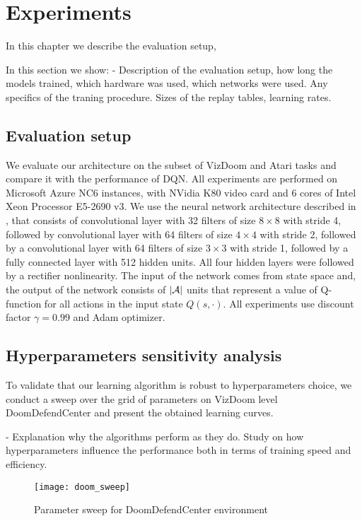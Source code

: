 \section{Experiments}

In this chapter we describe the evaluation setup,

In this section we show:
- Description of the evaluation setup, how long the models trained, which hardware was used,
which networks were used. Any specifics of the traning procedure. Sizes of the replay tables,
learning rates.

\subsection{Evaluation setup}

We evaluate our architecture on the subset of VizDoom and Atari tasks and compare it with the
performance of DQN. All experiments are performed on Microsoft Azure NC6 instances, with NVidia K80
video card and 6 cores of Intel Xeon Processor E5-2690 v3. We use the neural network architecture
described in \cite{mnih-dqn-2015}, that consists of convolutional layer with 32 filters of size $8
\times 8$ with stride 4, followed by convolutional layer with 64 filters of size $4 \times 4$ with
stride 2, followed by a convolutional layer with 64 filters of size $3 \times 3$ with stride 1,
followed by a fully connected layer with 512 hidden units. All four hidden layers were followed by
a rectifier nonlinearity. The input of the network comes from state space and,
the output of the network consists of $\left | \mathcal{A} \right |$ units that represent a value of Q-function
for all actions in the input state $Q(s, \cdot)$.
All experiments use discount factor $\gamma = 0.99$ and Adam optimizer.

\subsection{Hyperparameters sensitivity analysis}

To validate that our learning algorithm is robust to hyperparameters choice, we conduct a sweep
over the grid of parameters on VizDoom level DoomDefendCenter and present the obtained learning
curves.

- Explanation why the algorithms perform as they do. Study on how hyperparameters influence
the performance both in terms of training speed and efficiency.

\begin{figure}[h!]
\caption{Parameter sweep for DoomDefendCenter environment}
\texttt{[image: doom\_sweep]}
\end{figure}

